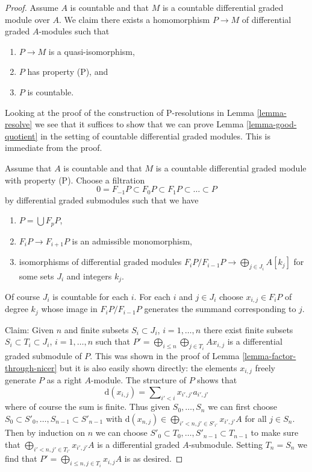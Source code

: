 \documentclass{amsart}
\theoremstyle{plain}
\theoremstyle{definition}
\theoremstyle{remark}
\numberwithin{equation}{subsection}
\begin{document}
\begin{proof}
\medskip\noindent
Assume $A$ is countable and that $M$ is a countable differential graded
module over $A$. We claim there exists a homomorphism
$P \to M$ of differential graded $A$-modules such that
\begin{enumerate}
\item $P \to M$ is a quasi-isomorphism,
\item $P$ has property (P), and
\item $P$ is countable.
\end{enumerate}
Looking at the proof of the construction of P-resolutions in
Lemma \ref{lemma-resolve} we see that it suffices to show that
we can prove Lemma \ref{lemma-good-quotient}
in the setting of countable differential graded modules.
This is immediate from the proof.

\medskip\noindent
Assume that $A$ is countable and that $M$ is a countable
differential graded module with property (P). Choose a filtration
$$
0 = F_{-1}P \subset F_0P \subset F_1P \subset \ldots \subset P
$$
by differential graded submodules such that we have
\begin{enumerate}
\item $P = \bigcup F_pP$,
\item $F_iP \to F_{i + 1}P$ is an admissible monomorphism,
\item isomorphisms of differential graded modules
$F_iP/F_{i - 1}P \to \bigoplus_{j \in J_i} A[k_j]$
for some sets $J_i$ and integers $k_j$.
\end{enumerate}
Of course $J_i$ is countable for each $i$. For each $i$ and
$j \in J_i$ choose $x_{i, j} \in F_iP$ of degree $k_j$ whose
image in $F_iP/F_{i - 1}P$ generates the summand corresponding
to $j$.

\medskip\noindent
Claim: Given $n$ and finite subsets $S_i \subset J_i$, $i = 1, \ldots, n$
there exist finite subsets $S_i \subset T_i \subset J_i$, $i = 1, \ldots, n$
such that $P' = \bigoplus_{i \leq n} \bigoplus_{j \in T_i} Ax_{i, j}$
is a differential graded submodule of $P$. This was shown in the
proof of Lemma \ref{lemma-factor-through-nicer} but it is also
easily shown directly: the elements $x_{i, j}$ freely generate
$P$ as a right $A$-module. The structure of $P$ shows that
$$
\text{d}(x_{i, j}) = \sum\nolimits_{i' < i} x_{i', j'}a_{i', j'}
$$
where of course the sum is finite.
Thus given $S_0, \ldots, S_n$ we can first choose
$S_0 \subset S'_0, \ldots, S_{n - 1} \subset S'_{n - 1}$ with
$\text{d}(x_{n, j}) \in \bigoplus_{i' < n, j' \in S'_{i'}} x_{i', j'}A$
for all $j \in S_n$. Then by induction on $n$ we can choose
$S'_0 \subset T_0, \ldots, S'_{n - 1} \subset T_{n - 1}$
to make sure that $\bigoplus_{i' < n, j' \in T_{i'}} x_{i', j'}A$
is a differential graded $A$-submodule. Setting $T_n = S_n$ we find that
$P' = \bigoplus_{i \leq n, j \in T_i} x_{i, j}A$ is as desired.


\end{proof}
\end{document}
